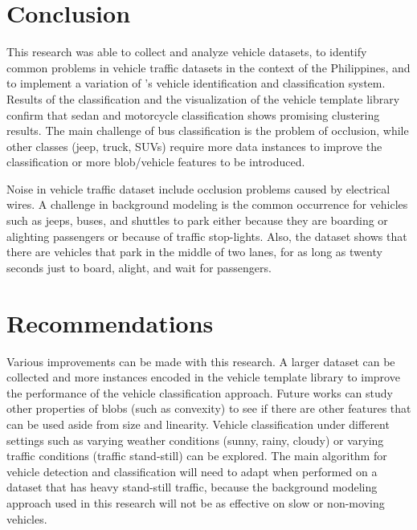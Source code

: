\documentclass[conference]{IEEEtran}
\begin{document}

\section{Conclusion}

This research was able to collect and analyze vehicle datasets, to identify common problems in vehicle traffic datasets in the context of the Philippines, and to implement a variation of \cite{Jun-Wei}'s vehicle identification and classification system. Results of the classification and the visualization of the vehicle template library confirm that sedan and motorcycle classification shows promising clustering results. The main challenge of bus classification is the problem of occlusion, while other classes (jeep, truck, SUVs) require more data instances to improve the classification or more blob/vehicle features to be introduced.

Noise in vehicle traffic dataset include occlusion problems caused by electrical wires. A challenge in background modeling is the common occurrence for vehicles such as jeeps, buses, and shuttles to park either because they are boarding or alighting passengers or because of traffic stop-lights. Also, the dataset shows that there are vehicles that park in the middle of two lanes, for as long as twenty seconds just to board, alight, and wait for passengers. 

\section{Recommendations}

Various improvements can be made with this research. A larger dataset can be collected and more instances encoded in the vehicle template library to improve the performance of the vehicle classification approach. Future works can study other properties of blobs (such as convexity) to see if there are other features that can be used aside from size and linearity. Vehicle classification under different settings such as varying weather conditions (sunny, rainy, cloudy) or varying traffic conditions (traffic stand-still) can be explored. The main algorithm for vehicle detection and classification will need to adapt when performed on a dataset that has heavy stand-still traffic, because the background modeling approach used in this research will not be as effective on slow or non-moving vehicles. 
\end{document}
